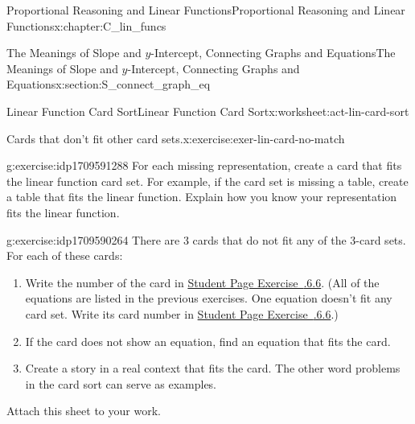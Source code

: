\documentclass[oneside,10pt,]{book}
\newcommand{\xreffont}{\relax}
\numberwithin{equation}{chapter}
\begin{document}
\begin{chapterptx}{Proportional Reasoning and Linear Functions}{}{Proportional Reasoning and Linear Functions}{}{}{x:chapter:C_lin_funcs}
\begin{sectionptx}{The Meanings of Slope and \(y\)-Intercept, Connecting Graphs and Equations}{}{The Meanings of Slope and \(y\)-Intercept, Connecting Graphs and Equations}{}{}{x:section:S_connect_graph_eq}
\begin{worksheet-subsection}{Linear Function Card Sort}{}{Linear Function Card Sort}{}{}{x:worksheet:act-lin-card-sort}
\begin{divisionexercise}{6}{Cards that don't fit other card sets.}{}{x:exercise:exer-lin-card-no-match}
%
\end{divisionexercise}%
\begin{divisionexercise}{7}{}{}{g:exercise:idp1709591288}%
For each missing representation, create a card that fits the linear function card set. For example, if the card set is missing a table, create a table that fits the linear function. Explain how you know your representation fits the linear function.%
\end{divisionexercise}%
\begin{divisionexercise}{8}{}{}{g:exercise:idp1709590264}%
There are 3 cards that do not fit any of the 3-card sets. For each of these cards:%
\begin{enumerate}[font=\bfseries,label=(\alph*),ref=\alph*]
\item{}Write the number of the card in \hyperlink{x:exercise:exer-lin-card-no-match}{Student Page Exercise~{\xreffont 2.7.6.6}}. (All of the equations are listed in the previous exercises. One equation doesn't fit any card set. Write its card number in \hyperlink{x:exercise:exer-lin-card-no-match}{Student Page Exercise~{\xreffont 2.7.6.6}}.)%
\item{}If the card does not show an equation, find an equation that fits the card.%
\item{}Create a story in a real context that fits the card. The other word problems in the card sort can serve as examples.%
\end{enumerate}
Attach this sheet to your work.%
\end{divisionexercise}%
\clearpage
\begin{image}{0}{1}{0}%

\end{image}
\end{worksheet-subsection}
\end{sectionptx}
\end{chapterptx}
\end{document}
